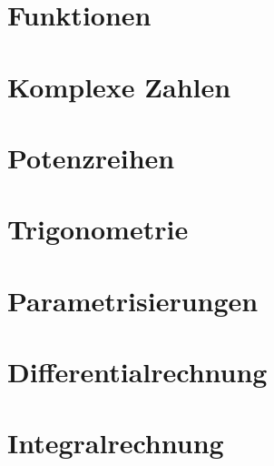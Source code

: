 \documentclass[numerate]{cheatsheet}
\author{Micha Bosshart - bmicha@ethz.ch \\ \vspace*{0.2em} \normalsize{ergänzt von Noa Sendlhofer \& Christian Leser} \vspace*{-0.2em}}
\begin{document}
    \section{Funktionen}
        
        
        
        
    \section{Komplexe Zahlen}
        
        
        
    \section{Potenzreihen}
        
        
        
    \section{Trigonometrie}
        
        
        
    \section{Parametrisierungen}
        
        
    \section{Differentialrechnung}
        
        
        
        
        
    \section{Integralrechnung}
        
        
        
        
        
        
        
        
        
        \vfill \null \columnbreak
\end{document}
